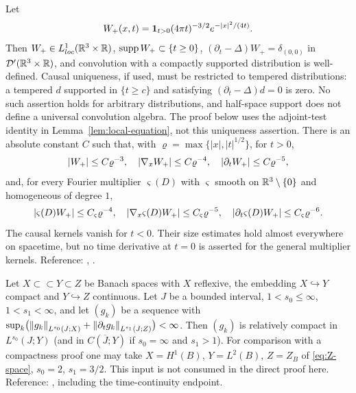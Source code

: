 \documentclass[11pt,reqno]{amsart}
\begin{document}
\begin{externalinput}\label{ext:heat-kernel}
Let
\[
W_{+}(x,t)=\mathbf{1}_{t>0}(4\pi t)^{-3/2}e^{-\left\lvert x \right\rvert^{2}/(4t)}
.
\] Then
$W_{+}\in L^{1}_{loc}(\mathbb{R}^{3}\times\mathbb{R})$, $\operatorname{supp} W_{+}\subset\{t\ge0\}$,
$(\partial_{t}-\Delta)W_{+}=\delta_{(0,0)}$ in $\mathcal{D}'(\mathbb{R}^{3}\times\mathbb{R})$,
and convolution with a compactly supported distribution is well-defined.
Causal uniqueness, if used, must be restricted to tempered distributions:
a tempered $d$ supported in $\{t\ge c\}$ and satisfying
$(\partial_t-\Delta)d=0$ is zero. No such assertion holds for arbitrary
distributions, and half-space support does not define a universal
convolution algebra. The proof below uses the adjoint-test identity
in Lemma~\ref{lem:local-equation}, not this uniqueness assertion.
There is an absolute constant $C$
such that, with
$\varrho=\max\{|x|,|t|^{1/2}\}$, for $t>0$,
\[
  \left\lvert W_{+} \right\rvert\le C\varrho^{-3},\quad
  \left\lvert \nabla_{x}W_{+} \right\rvert\le C\varrho^{-4},\quad
  \left\lvert \partial_{t}W_{+} \right\rvert\le C\varrho^{-5},
\]
and, for every Fourier multiplier $\varsigma(D)$ with $\varsigma$ smooth on
$\mathbb{R}^{3}\setminus\{0\}$ and homogeneous of degree $1$,
\[
  \left\lvert \varsigma(D)W_{+} \right\rvert\le C_{\varsigma}\varrho^{-4},\quad
  \left\lvert \nabla_{x}\varsigma(D)W_{+} \right\rvert\le C_{\varsigma}\varrho^{-5},\quad
  \left\lvert \partial_{t}\varsigma(D)W_{+} \right\rvert\le C_{\varsigma}\varrho^{-6}.
\]
The causal kernels vanish for $t<0$. Their size estimates hold almost
everywhere on spacetime, but no time derivative at $t=0$ is asserted for
the general multiplier kernels.
Reference: \cite[\S IV.11]{LadyzhenskayaSolonnikovUraltseva1968},
\cite[Ch.~5]{LemarieRieusset2016}.
\end{externalinput}

\begin{externalinput}\label{ext:aubin-lions}
Let $X\subset\subset Y\subset Z$ be Banach spaces with $X$ reflexive, the
embedding $X\hookrightarrow Y$ compact and $Y\hookrightarrow Z$ continuous. Let
$J$ be a bounded interval, $1<s_{0}\le\infty$, $1<s_{1}<\infty$, and let
$(g_{k})$ be a sequence with
$\sup_{k}\bigl(\left\lVert g_{k} \right\rVert_{L^{s_{0}}(J;X)}+\left\lVert \partial_{t}g_{k} \right\rVert_{L^{s_{1}}(J;Z)}\bigr)<\infty$.
Then $(g_{k})$ is relatively compact in $L^{s_{0}}(J;Y)$ (and in $C(\overline{J};Y)$
if $s_{0}=\infty$ and $s_{1}>1$). For comparison with a compactness proof one may take
$X=H^{1}(B)$, $Y=L^{2}(B)$, $Z=Z_B$ of \eqref{eq:Z-space},
$s_0=2$, $s_1=3/2$. This input is not consumed in the direct proof here.
Reference: \cite[Corollary 4]{Simon1987}, including the time-continuity endpoint.
\end{externalinput}
\end{document}
